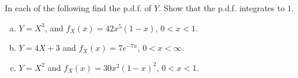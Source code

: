 \documentclass[14pt]{elegantbook}
\begin{document}

\setcounter{chapter}{3}
\chapter{}
    \setcounter{chapter}{2}
    

    \setcounter{exer}{0}
    \begin{exercise}
        In each of the following find the p.d.f. of $Y$. Show that the p.d.f. integrates to $1$.
        \begin{enumerate}[(a)]
            \item $Y=X^3$, and $f_X(x)=42x^5(1-x)$, $0<x<1$. 
            \item $Y=4X+3$ and $f_X(x)=7e^{-7x}$, $0<x<\infty$. 
            \item $Y=X^2$ and $f_X(x)=30x^2(1-x)^2$, $0<x<1$.
        \end{enumerate}
    \end{exercise}
\end{document}
